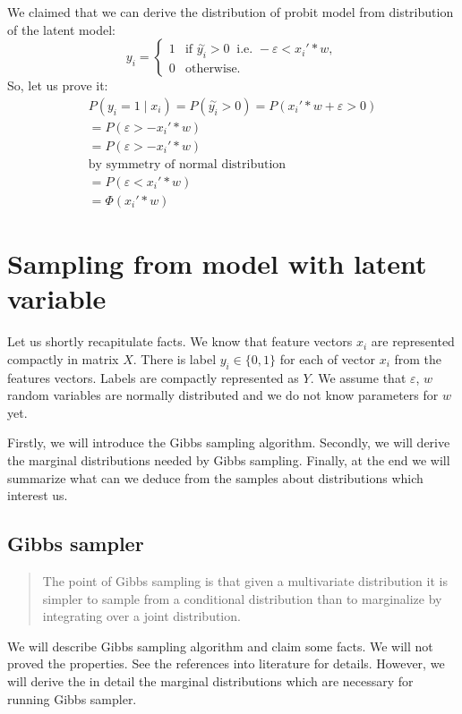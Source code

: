 We claimed that we can derive the distribution of probit model from distribution of the latent model:
\begin{equation}\label{eq:model_equivalence}
    y_i = 
     \begin{cases} 
         1 & \text{if }\overset{\sim}{y_i} > 0 \ \text{ i.e. } - \varepsilon < x_i' * w, \\
         0 &\text{otherwise.} 
     \end{cases}
\end{equation}
So, let us prove it:
\begin{eqnarray}
    P(y_i=1 \mid x_i)= P(\overset{\sim}{y_i} > 0 ) = P(x_i' * w + \varepsilon > 0) \\
    = P(\varepsilon > - x_i' * w) \\
    = P(\varepsilon > - x_i' * w) \\
    \text{by symmetry of normal distribution} \\
    = P(\varepsilon < x_i' * w) \\
    = \Phi(x_i' * w)
\end{eqnarray}



\section{Sampling from model with latent variable} 
\label{sec:sampling_from_model_with_latent_variable}
Let us shortly recapitulate facts. We know that feature vectors $x_i$ are represented compactly in matrix $X$. There is label $y_i \in \{0,1\}$ for each of vector $x_i$ from the features vectors. Labels are compactly represented as $Y$. We assume that $\varepsilon$, $w$ random variables are normally distributed and we do not know parameters for $w$ yet.

Firstly, we will introduce the Gibbs sampling algorithm. Secondly, we will derive the marginal distributions needed by Gibbs sampling. Finally, at the end we will summarize what can we deduce from the samples about distributions which interest us.

\subsection*{Gibbs sampler}
\label{sub:gibbs_sampler}
\begin{quote}
The point of Gibbs sampling is that given a multivariate distribution it is simpler to sample from a conditional distribution than to marginalize by integrating over a joint distribution. \cite{wiki_gibbs}
\end{quote}
We will describe Gibbs sampling algorithm and claim some facts. We will not proved the properties. See the references into literature for details. However, we will derive the in detail the marginal distributions which are necessary for running Gibbs sampler.

